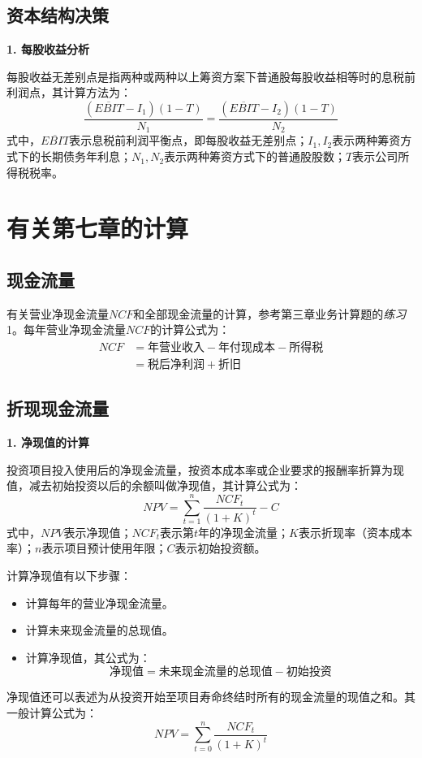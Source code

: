 \documentclass[
  10pt,
  twoside,
  openany,
  b5paper, %
  colorscheme = black, %
  xits = false,
]{qyxf-book}
\begin{document}
\subsection{资本结构决策}

\textbf{1. 每股收益分析}

每股收益无差别点是指两种或两种以上筹资方案下普通股每股收益相等时的息税前利润点，其计算方法为：
\begin{equation*}
	\frac{(\overline{EBIT}-I_1)(1-T)}{N_1}= \frac{(\overline{EBIT}-I_2)(1-T)}{N_2}
\end{equation*}
式中，$\overline{EBIT}$表示息税前利润平衡点，即每股收益无差别点；$I_1,I_2$表示两种筹资方式下的长期债务年利息；$N_1,N_2$表示两种筹资方式下的普通股股数；$T$表示公司所得税税率。

\newpage

\section{有关第七章的计算}

\subsection{现金流量}

有关营业净现金流量$NCF$和全部现金流量的计算，参考第三章业务计算题的\emph{练习}1。每年营业净现金流量$NCF$的计算公式为：
\begin{equation*}
	\begin{aligned}
		NCF &= \text{年营业收入} - \text{年付现成本} - \text{所得税} \\
	&= \text{税后净利润} + \text{折旧}
	\end{aligned}
\end{equation*}

\subsection{折现现金流量}

\textbf{1. 净现值的计算}

投资项目投入使用后的净现金流量，按资本成本率或企业要求的报酬率折算为现值，减去初始投资以后的余额叫做净现值，其计算公式为：
\begin{equation*}
	NPV = \sum_{t=1}^{n} \frac{NCF_t}{(1+K)^t}-C
\end{equation*}
式中，$NPV$表示净现值；$NCF_t$表示第$t$年的净现金流量；$K$表示折现率（资本成本率）；$n$表示项目预计使用年限；$C$表示初始投资额。

计算净现值有以下步骤：
\begin{itemize}
	\item 计算每年的营业净现金流量。
	\item 计算未来现金流量的总现值。
	\item 计算净现值，其公式为：
	\begin{equation*}
		\text{净现值} = \text{未来现金流量的总现值}- \text{初始投资}
	\end{equation*}
\end{itemize}
净现值还可以表述为从投资开始至项目寿命终结时所有的现金流量的现值之和。其一般计算公式为：
\begin{equation*}
	NPV = \sum_{t=0}^{n} \frac{NCF_t}{(1+K)^t}
\end{equation*}
\end{document}
